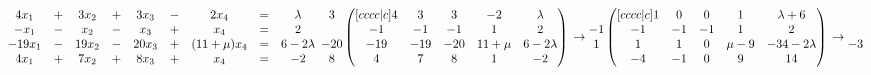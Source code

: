 \documentclass{article}
\begin{document}
    \begin{math}
        \begin{matrix}
          4x_1 & + & 3x_2 & + & 3x_3 & - & 2x_4 & = & \lambda\\
          -x_1 & - & x_2 & - & x_3 & + & x_4 & = & 2\\
          -19x_1 & - & 19x_2 & - & 20x_3 & + & (11 + \mu)x_4 & = & 6 - 2\lambda\\
          4x_1 & + & 7x_2 & + & 8x_3 & + & x_4 & = & -2
        \end{matrix}\\
        \\
        \\
        \begin{matrix}
          3\\
          ~\\
          -20\\
          8
        \end{matrix}
        \begin{pmatrix}[cccc|c]
            4 & 3 & 3 & -2 &  \lambda\\
            -1  &  -1 &  -1 & 1 & 2\\
            -19 & -19 & -20 & 11 + \mu & 6 - 2\lambda\\
            4 & 7 & 8 & 1 & -2
        \end{pmatrix}\\
        \\
        \\
        \to
        \begin{matrix}
          ~\\
          -1\\
          1\\
          ~
        \end{matrix}
        \begin{pmatrix}[cccc|c]
            1 & 0 & 0 & 1 & \lambda + 6\\
            -1 & -1 & -1 & 1 & 2\\
            1 & 1 & 0 & \mu - 9 & -34 - 2\lambda\\
            -4 & -1 & 0 & 9 & 14
        \end{pmatrix}\\
        \\
        \\
        \to
        \begin{matrix}
          ~\\
          -3\\

\end{matrix}
\end{math}
\end{document}
